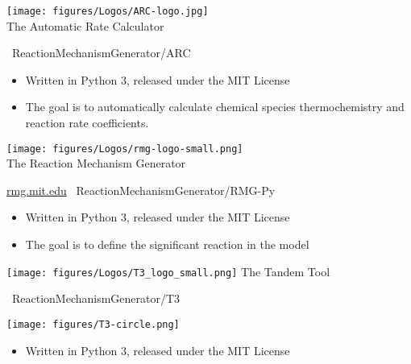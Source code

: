 \begin{frame}{
 \hspace{-5mm}
 \texttt{[image: figures/Logos/ARC-logo.jpg]}\\
 The Automatic Rate Calculator
}


\ghinlinelogo\ ReactionMechanismGenerator/ARC

\vspace{5mm}

\begin{itemize}
 \item Written in Python 3, released under the MIT License
 \item The goal is to automatically calculate chemical species thermochemistry and reaction rate coefficients.
\end{itemize}

\end{frame}


\begin{frame}{
 \hspace{-5mm}
 \texttt{[image: figures/Logos/rmg-logo-small.png]}\\
 The Reaction Mechanism Generator
}

\url{rmg.mit.edu}
\hspace{10mm}
\ghinlinelogo\ ReactionMechanismGenerator/RMG-Py

\vspace{5mm}

\begin{itemize}
 \item Written in Python 3, released under the MIT License
 \item The goal is to define the significant reaction in the model
\end{itemize}

\end{frame}


\begin{frame}{
 \hspace{-5mm}
 \texttt{[image: figures/Logos/T3\_logo\_small.png]}
 The Tandem Tool
}

\ghinlinelogo\ ReactionMechanismGenerator/T3

{
\centering
\texttt{[image: figures/T3-circle.png]}
}

\begin{itemize}
 \item Written in Python 3, released under the MIT License
\end{itemize}

\end{frame}

